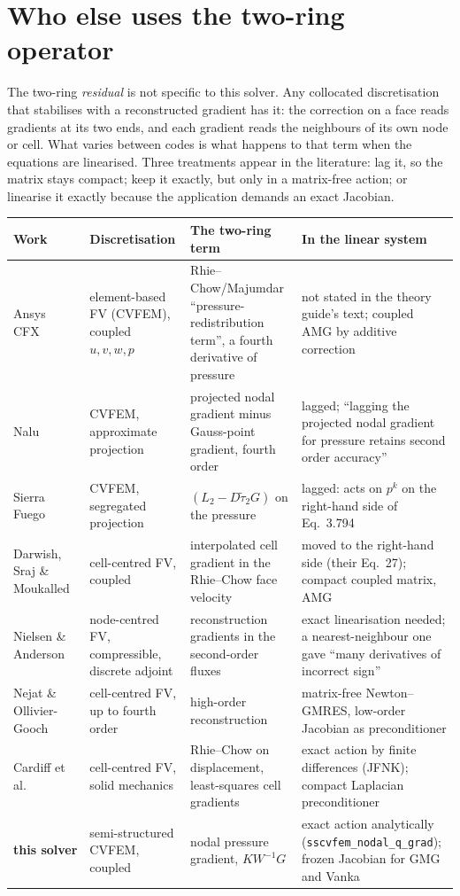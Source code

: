 \documentclass[11pt,a4paper]{article}
\newcommand{\code}[1]{\texttt{\small #1}}
\begin{document}
\FloatBarrier
\section{Who else uses the two-ring operator}
\label{sec:sota}

The two-ring \emph{residual} is not specific to this solver. Any collocated discretisation that
stabilises with a reconstructed gradient has it: the correction on a face reads gradients at its
two ends, and each gradient reads the neighbours of its own node or cell. What varies between codes
is what happens to that term when the equations are linearised. Three treatments appear in the
literature: lag it, so the matrix stays compact; keep it exactly, but only in a matrix-free action;
or linearise it exactly because the application demands an exact Jacobian.

\begin{center}
\small
\begin{tabular}{@{}L{3.2cm}L{3.5cm}L{4.2cm}L{4.2cm}@{}}
\toprule
Work & Discretisation & The two-ring term & In the linear system \\
\midrule
Ansys CFX~\cite{cfx} & element-based FV (CVFEM), coupled $u,v,w,p$ &
Rhie--Chow/Majumdar ``pressure-redistribution term'', a fourth derivative of pressure &
not stated in the theory guide's text; coupled AMG by additive correction \\
Nalu~\cite{nalu} & CVFEM, approximate projection &
projected nodal gradient minus Gauss-point gradient, fourth order &
lagged; ``lagging the projected nodal gradient for pressure retains second order accuracy'' \\
Sierra Fuego~\cite{fuego} & CVFEM, segregated projection &
$(L_2 - D\tilde\tau_2 G)$ on the pressure &
lagged: acts on $p^k$ on the right-hand side of Eq.~3.794 \\
Darwish, Sraj \& Moukalled~\cite{darwish_nhtb,darwish_jcp} & cell-centred FV, coupled &
interpolated cell gradient in the Rhie--Chow face velocity &
moved to the right-hand side (their Eq.~27); compact coupled matrix, AMG \\
Nielsen \& Anderson~\cite{nielsen98} & node-centred FV, compressible, discrete adjoint &
reconstruction gradients in the second-order fluxes &
exact linearisation needed; a nearest-neighbour one gave ``many derivatives of incorrect sign'' \\
Nejat \& Ollivier-Gooch~\cite{nejat08} & cell-centred FV, up to fourth order &
high-order reconstruction &
matrix-free Newton--GMRES, low-order Jacobian as preconditioner \\
Cardiff et al.~\cite{cardiff25} & cell-centred FV, solid mechanics &
Rhie--Chow on displacement, least-squares cell gradients &
exact action by finite differences (JFNK); compact Laplacian preconditioner \\
\textbf{this solver} & semi-structured CVFEM, coupled &
nodal pressure gradient, $K W^{-1} G$ &
exact action analytically (\code{sscvfem\_nodal\_q\_grad}); frozen Jacobian for GMG and Vanka \\
\bottomrule
\end{tabular}
\end{center}
\end{document}
